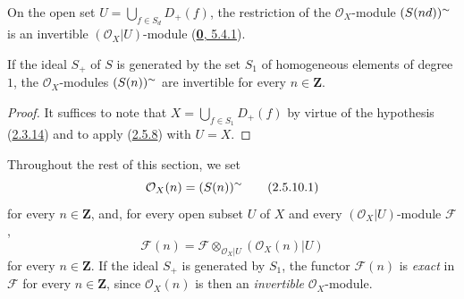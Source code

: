 \begin{corollary}[2.5.8]
\label{II.2.5.8}
On the open set $U=\bigcup_{f\in S_d}D_+(f)$,
the restriction of the $\mathcal{O}_X$-module $(S(nd))^{\sim}$ is an
invertible $(\mathcal{O}_X|U)$-module
\textup{(\hyperref[0.5.4.1]{\textbf{0}, 5.4.1})}.
\end{corollary}

\begin{corollary}[2.5.9]
\label{II.2.5.9}
If the ideal $S_+$ of $S$ is generated by the set $S_1$ of homogeneous
elements of degree $1$, the $\mathcal{O}_X$-modules
$(S(n))^{\sim}$ are invertible for every $n\in\mathbf{Z}$.
\end{corollary}

\begin{proof}
It suffices to note that
$X=\bigcup_{f\in S_1}D_+(f)$ by virtue of the hypothesis
(\hyperref[II.2.3.14]{2.3.14}) and to apply
(\hyperref[II.2.5.8]{2.5.8}) with $U=X$.
\end{proof}

\begin{env}[2.5.10]
\label{II.2.5.10}
Throughout the rest of this section, we set
\[
\label{II.2.5.10.1}
  \mathcal{O}_X(n)=(S(n))^{\sim}
\tag{2.5.10.1}
\]
for every $n\in\mathbf{Z}$, and, for every open subset $U$ of $X$ and every
$(\mathcal{O}_X|U)$-module $\mathcal{F}$,
\[
\label{II.2.5.10.2}
  \mathcal{F}(n)=
  \mathcal{F}\otimes_{\mathcal{O}_X|U}(\mathcal{O}_X(n)|U)
\tag{2.5.10.2}
\]
for every $n\in\mathbf{Z}$. If the ideal $S_+$ is generated by $S_1$, the
functor $\mathcal{F}(n)$ is \emph{exact} in
$\mathcal{F}$ for every $n\in\mathbf{Z}$, since $\mathcal{O}_X(n)$ is then
an \emph{invertible} $\mathcal{O}_X$-module.
\end{env}

